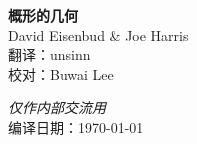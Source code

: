 \documentclass[11pt]{book}
\begin{document}
\begin{titlepage}
	\begin{flushright}
	{\Huge\bfseries 概形的几何}\\[\baselineskip]
	David Eisenbud \& Joe Harris \\
	翻译：unsinn \\
	校对：Buwai Lee 
	\end{flushright}
	\vfill
	{\Large\itshape 仅作内部交流用}\\
	\noindent 编译日期：\today
\end{titlepage}
\clearpage
\thispagestyle{empty}
\frontmatter
\tableofcontents
\mainmatter
	
	
	
	
	
	
	
\backmatter
 	
\printindex
\end{document}
